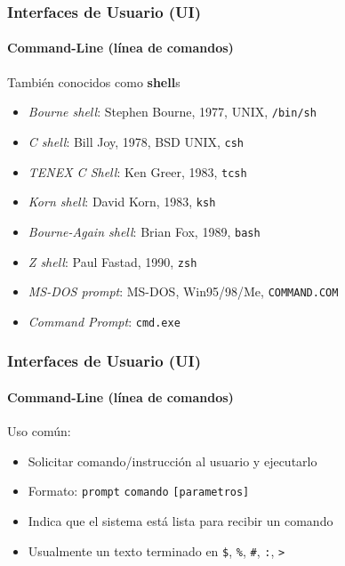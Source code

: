 \documentclass[letter]{beamer}
\begin{document}
\begin{frame}
  \frametitle{Interfaces de Usuario (UI)}
  \framesubtitle{Command-Line (línea de comandos)}
  
  También conocidos como {\bf shell}s
  
  \begin{itemize}
    \item<2->{\em Bourne shell}: Stephen Bourne, 1977, UNIX, {\tt /bin/sh}
    \item<2->{\em C shell}: Bill Joy, 1978, BSD UNIX, {\tt csh}
    \item<2->{\em TENEX C Shell}: Ken Greer, 1983, {\tt tcsh}
    \item<2->{\em Korn shell}: David Korn, 1983, {\tt ksh}
    \item<2->{\em Bourne-Again shell}: Brian Fox, 1989, {\tt bash}
    \item<2->{\em Z shell}: Paul Fastad, 1990, {\tt zsh}
  \end{itemize}
  
  \begin{itemize}
    \item<3->{\em MS-DOS prompt}: MS-DOS, Win95/98/Me, {\tt COMMAND.COM}
    \item<3->{\em Command Prompt}: {\tt cmd.exe} 
  \end{itemize}
\end{frame}
\begin{frame}
  \frametitle{Interfaces de Usuario (UI)}
  \framesubtitle{Command-Line (línea de comandos)}

  Uso común:
  \begin{itemize}
    \item Solicitar comando/instrucción al usuario y ejecutarlo
    \item Formato: {\tt prompt} {\tt comando} {\tt [parametros]} 
  \end{itemize}

  \begin{itemize}
    \item<2->Indica que el sistema está lista para recibir un comando
    \item<2->Usualmente un texto terminado en {\tt \$}, {\tt \%}, {\tt \#}, {\tt :}, {\tt >}
  \end{itemize}


  

\end{frame}
\end{document}
